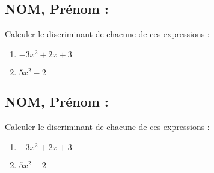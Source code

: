 \documentclass[a4paper,11pt,exos]{nsi} %
\begin{document}
\subsection*{NOM, Prénom : \dotfill} 


\maketitle




\begin{exercice}
Calculer le discriminant de chacune de ces expressions :
\begin{multicols}{2}
	\begin{enumerate}
		\item $-3x^2+2x+3$
	
		\item $5x^2-2$
	\end{enumerate}
\end{multicols}

\end{exercice}




\subsection*{NOM, Prénom : \dotfill} 


\maketitle




\begin{exercice}
Calculer le discriminant de chacune de ces expressions :
\begin{multicols}{2}
	\begin{enumerate}
		\item $-3x^2+2x+3$
	
		\item $5x^2-2$
	\end{enumerate}
\end{multicols}

\end{exercice}

\end{document}
